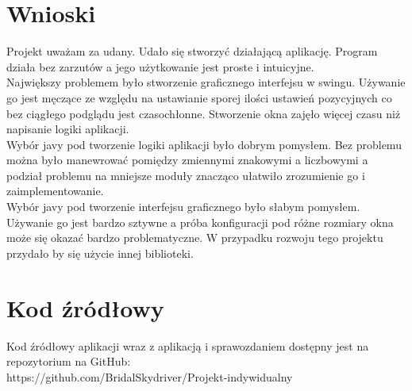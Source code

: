 \documentclass[11pt,a4paper]{article}
\begin{document}
\section{Wnioski}
Projekt uważam za udany. Udało się stworzyć działającą aplikację. Program działa bez zarzutów a jego użytkowanie jest proste i intuicyjne.\\
Największy problemem było stworzenie graficznego interfejsu w swingu. Używanie go jest męczące ze względu na ustawianie sporej ilości ustawień pozycyjnych co bez ciągłego podglądu jest czasochłonne. Stworzenie okna zajęło więcej czasu niż napisanie logiki aplikacji.\\
Wybór javy pod tworzenie logiki aplikacji było dobrym pomysłem. Bez problemu można było manewrować pomiędzy zmiennymi znakowymi a liczbowymi a podział problemu na mniejsze moduły znacząco ułatwiło zrozumienie go i zaimplementowanie.\\
Wybór javy pod tworzenie interfejsu graficznego było słabym pomysłem. Używanie go jest bardzo sztywne a próba konfiguracji pod różne rozmiary okna może się okazać bardzo problematyczne. W przypadku rozwoju tego projektu przydało by się użycie innej biblioteki.\\

\section{Kod źródłowy}
Kod źródłowy aplikacji wraz z aplikacją i sprawozdaniem dostępny jest na repozytorium na GitHub:\\
https://github.com/BridalSkydriver/Projekt-indywidualny
\end{document}
